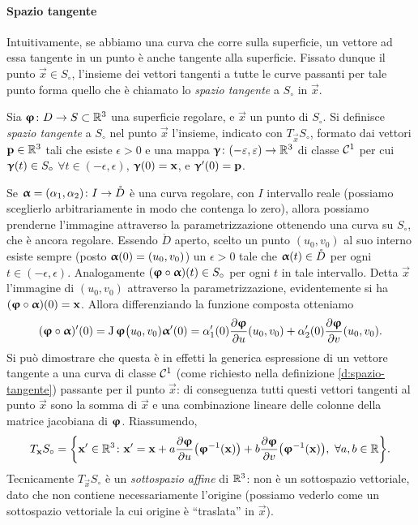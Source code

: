 \paragraph{Spazio tangente}
Intuitivamente, se abbiamo una curva che corre sulla superficie, un vettore ad essa tangente in un punto è anche tangente alla superficie.
Fissato dunque il punto $\vec x\in S_\circ$, l'insieme dei vettori tangenti a tutte le curve passanti per tale punto forma quello che è chiamato lo \emph{spazio tangente} a $S_\circ$ in $\vec x$.
\begin{definizione} \label{d:spazio-tangente}
	Sia $\bm{\upvarphi}\colon D\to S\subset\mathbb{R}^3$ una superficie regolare, e $\vec x$ un punto di $S_\circ$.
	Si definisce \emph{spazio tangente} a $S_\circ$ nel punto $\vec x$ l'insieme, indicato con $T_{\vec x}S_\circ$, formato dai vettori $\mathbf{p}\in\mathbb{R}^3$ tali che esiste $\epsilon>0$ e una mappa $\bm{\upgamma}\colon(-\varepsilon,\varepsilon)\to\mathbb{R}^3$ di classe $\mathcal{C}^{{1}}$ per cui $\bm{\upgamma}(t)\in S_\circ$ $\forall t\in(-\epsilon,\epsilon)$, $\bm{\upgamma}(0)=\mathbf{x}$, e $\bm{\upgamma}'(0)=\mathbf{p}$.
\end{definizione}
Se $\bm{\upalpha}=(\alpha_1,\alpha_2)\colon I\to\mathring{D}$ è una curva regolare, con $I$ intervallo reale (possiamo sceglierlo arbitrariamente in modo che contenga lo zero), allora possiamo prenderne l'immagine attraverso la parametrizzazione ottenendo una curva su $S_\circ$, che è ancora regolare.
Essendo $\mathring{D}$ aperto, scelto un punto $(u_0,v_0)$ al suo interno esiste sempre (posto $\bm{\upalpha}(0)=(u_0,v_0)$) un $\epsilon>0$ tale che $\bm{\upalpha}(t)\in\mathring{D}$ per ogni $t\in(-\epsilon,\epsilon)$.
Analogamente $(\bm{\upvarphi}\circ\bm{\upalpha})(t)\in S_\circ$ per ogni $t$ in tale intervallo.
Detta $\vec x$ l'immagine di $(u_0,v_0)$ attraverso la parametrizzazione, evidentemente si ha $(\bm{\upvarphi}\circ\bm{\upalpha})(0)=\mathbf{x}$.
Allora differenziando la funzione composta otteniamo
\begin{equation}
	(\bm{\upvarphi}\circ\bm{\upalpha})'(0)=\operatorname{J}\bm{\upvarphi}\big(u_0,v_0)\bm{\upalpha}'(0)=\alpha_1'(0)\frac{\partial {\bm{\upvarphi}}}{\partial {u}}(u_0,v_0)+\alpha_2'(0)\frac{\partial {\bm{\upvarphi}}}{\partial {v}}(u_0,v_0).
\end{equation}
Si può dimostrare che questa è in effetti la generica espressione di un vettore tangente a una curva di classe $\mathcal{C}^{{1}}$ (come richiesto nella definizione \ref{d:spazio-tangente}) passante per il punto $\vec x$: di conseguenza tutti questi vettori tangenti al punto $\vec x$ sono la somma di $\vec x$ e una combinazione lineare delle colonne della matrice jacobiana di $\bm{\upvarphi}$.
Riassumendo,
\begin{equation}
	T_{\mathbf{x}}S_\circ=\bigg\{\mathbf{x}'\in\mathbb{R}^3\colon \mathbf{x}'=\mathbf{x}+a\frac{\partial {\bm{\upvarphi}}}{\partial {u}}\big(\bm{\upvarphi}^{-1}(\mathbf{x})\big)+b\frac{\partial {\bm{\upvarphi}}}{\partial {v}}\big(\bm{\upvarphi}^{-1}(\mathbf{x})\big),\ \forall a,b\in\mathbb{R}\bigg\}.
	\label{eq:spazio-tangente}
\end{equation}
Tecnicamente $T_{\vec x}S_\circ$ è un \emph{sottospazio affine} di $\mathbb{R}^3$: non è un sottospazio vettoriale, dato che non contiene necessariamente l'origine (possiamo vederlo come un sottospazio vettoriale la cui origine è ``traslata'' in $\vec x$).

